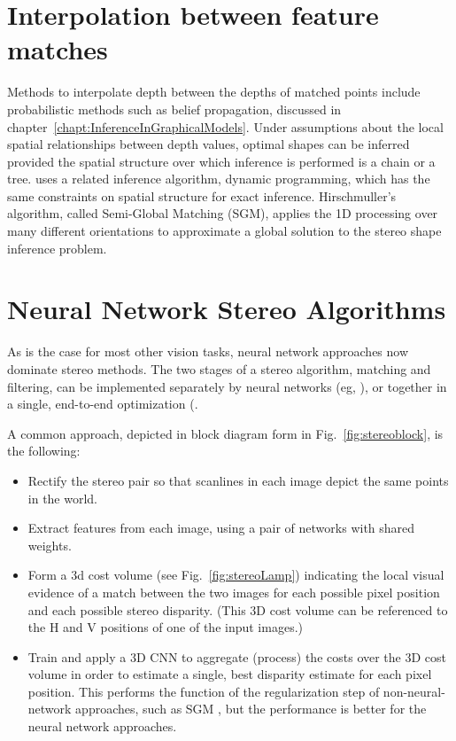 \section{Interpolation between feature matches}
Methods to interpolate depth between the depths of matched points include probabilistic methods such as belief propagation, discussed in chapter~\ref{chapt:InferenceInGraphicalModels}.  Under assumptions about the local spatial relationships between depth values, optimal shapes can be inferred provided the spatial structure over which inference is performed is a chain or a tree.  \cite{Hirschmuller2007} uses a related inference algorithm, dynamic programming, which has the same constraints on spatial structure for exact inference.  Hirschmuller's algorithm, called Semi-Global Matching (SGM), applies the 1D processing over many different orientations to approximate a global solution to the stereo shape inference problem.

\section{Neural Network Stereo Algorithms}
As is the case for most other vision tasks, neural network approaches now dominate stereo methods.  The two stages of a stereo algorithm, matching and filtering, can be implemented separately by neural networks (eg, \cite{Zbontar2015}), or together in a single, end-to-end optimization (\cite{Zhang2019GANet,Chang2018,Mayer2016,Kendall2017}.

A common approach, depicted in block diagram form in Fig.~\ref{fig:stereoblock}, is the following:
\begin{itemize}
    \item Rectify the stereo pair so that scanlines in each image depict the same points in the world.
    \item Extract features from each image, using a pair of networks with shared weights.
    \item Form a 3d cost volume (see Fig.~\ref{fig:stereoLamp}) indicating the local visual evidence of a match between the two images for each possible pixel position and each possible stereo disparity.  (This 3D cost volume can be referenced to the H and V positions of one of the input images.)
    \item Train and apply a 3D CNN to aggregate (process) the costs over the 3D cost volume in order to estimate a single, best disparity estimate for each pixel position.  This performs the function of the regularization step of non-neural-network approaches, such as SGM \cite{Hirschmuller2007}, but the performance is better for the neural network approaches.
\end{itemize}


